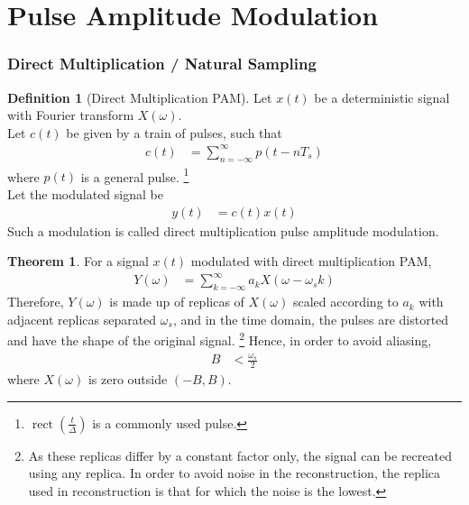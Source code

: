 \documentclass[titlepage, fleqn, a4paper, 12pt, twoside]{article}
\theoremstyle{definition}
\newtheorem{definition}{Definition}
\theoremstyle{theorem}
\newtheorem{theorem}{Theorem}
\DeclareMathOperator{\rect}{\mathrm{rect}}
\begin{document}
\clearpage
\part{Pulse Amplitude Modulation}

\section{Direct Multiplication / Natural Sampling}

\begin{definition}[Direct Multiplication PAM]
	Let $x(t)$ be a deterministic signal with Fourier transform $X(\omega)$.\\
	Let $c(t)$ be given by a train of pulses, such that
	\begin{align*}
		c(t) &= \sum\limits_{n = -\infty}^{\infty} p(t - n T_s)
	\end{align*}
	where $p(t)$ is a general pulse.
	\footnote{$\rect\left( \frac{t}{\Delta} \right)$ is a commonly used pulse.}\\
	Let the modulated signal be
	\begin{align*}
		y(t) &= c(t) x(t)
	\end{align*}
	Such a modulation is called direct multiplication pulse amplitude modulation.
	\label{def:direct_multiplication_PAM}
\end{definition}

\begin{theorem}
	For a signal $x(t)$ modulated with direct multiplication PAM,
	\begin{align*}
		Y(\omega) &= \sum\limits_{k = -\infty}^{\infty} a_k X(\omega - \omega_s k)
	\end{align*}
	Therefore, $Y(\omega)$ is made up of replicas of $X(\omega)$ scaled according to $a_k$ with adjacent replicas separated $\omega_s$, and in the time domain, the pulses are distorted and have the shape of the original signal.
	\footnote{As these replicas differ by a constant factor only, the signal can be recreated using any replica. In order to avoid noise in the reconstruction, the replica used in reconstruction is that for which the noise is the lowest.}
	Hence, in order to avoid aliasing,
	\begin{align*}
		B &< \frac{\omega_s}{2}
	\end{align*}
	where $X(\omega)$ is zero outside $(-B,B)$.
	\label{thm:Fourier_transform_of_signal_modulated_by_direct_multiplication_PAM}
\end{theorem}
\end{document}
